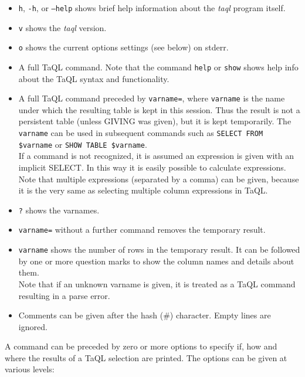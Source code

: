   \begin{itemize}
  \item \texttt{h}, \texttt{-h}, or \texttt{--help} shows brief help
    information about the {\em taql} program itself. 
  \item \texttt{v} shows the {\em taql} version.
  \item \texttt{o} shows the current options settings (see below) on stderr.
  \item A full TaQL command. Note that the command \texttt{help} or
    \texttt{show} shows help info about the TaQL syntax
    and functionality.
  \item A full TaQL command preceded by \texttt{varname=}, where
    \texttt{varname} is the name under which the resulting table is
    kept in this session. Thus the result is not a persistent table
    (unless GIVING was given), but it is kept temporarily.
    The \texttt{varname} can be used in subsequent commands such as
    \texttt{SELECT FROM \$varname} or \texttt{SHOW TABLE \$varname}.
    \\If a command is not recognized, it is assumed an expression is
    given with an implicit SELECT. In this way it is easily possible to calculate expressions. Note
    that multiple expressions (separated by a comma) can be given,
    because it is the very same as selecting multiple column expressions in TaQL.
  \item \texttt{?} shows the varnames.
  \item \texttt{varname=} without a further command removes the
    temporary result.
  \item \texttt{varname} shows the number of rows in the temporary
    result. It can be followed by one or more question marks to show
    the column names and details about them.
    \\Note that if an unknown varname is given, it is treated as a
    TaQL command resulting in a parse error.
  \item Comments can be given after the hash (\#) character. Empty
    lines are ignored.
  \end{itemize}
  A command can be preceded by zero or more options to specify if,
  how and where the results of a TaQL selection are printed. The
  options can be given at various levels:
